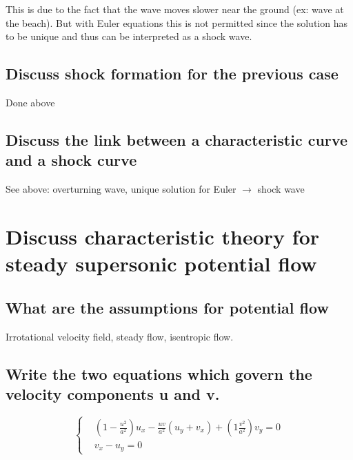\documentclass[british,french,11pt, a4paper, openany]{article}
\begin{document}
	This is due to the fact that the wave moves slower near the ground (ex: wave at the beach). But with Euler equations this is not permitted since the solution has to be unique and thus can be interpreted as a shock wave. 


\subsection{Discuss shock formation for the previous case}

Done above

\subsection{Discuss the link between a characteristic curve and a shock curve}

See above: overturning wave, unique solution for Euler $\rightarrow$ shock wave



\section{Discuss characteristic theory for steady supersonic potential flow}
\subsection{What are the assumptions for potential flow}
Irrotational velocity field, steady flow, isentropic flow.

\subsection{Write the two equations which govern the velocity components u and v.}

\begin{equation}
\left\{
\begin{aligned}
&\left( 1 - \frac{u^2}{a^2} \right) u_x - \frac{uv}{a^2} (u_y + v_x) + \left( 1  \frac{v^2}{a^2} \right) v_y = 0\\
& v_x - u_y = 0
\end{aligned}
\right.
\end{equation}
\end{document}
